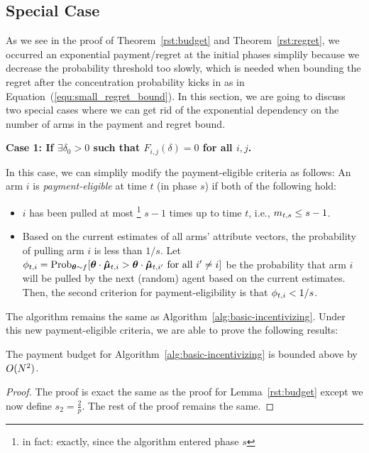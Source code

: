 \subsection{Special Case}

As we see in the proof of Theorem~\ref{rst:budget} and Theorem~\ref{rst:regret}, we occurred an exponential payment/regret at the initial phases simplily because we decrease the probability threshold too slowly, which is needed when bounding the regret after the concentration probability kicks in as in Equation~(\ref{equ:small_regret_bound}). In this section, we are going to discuss two special cases where we can get rid of the exponential dependency on the number of arms in the payment and regret bound. 

\textbf{Case 1: If $\exists \delta_0>0$ such that $F_{i,j}(\delta)=0$ for all $i,j$.}

In this case, we can simplily modify the payment-eligible criteria as follows: An arm $i$ is \emph{payment-eligible} at time $t$ (in phase $s$)
if both of the following hold:

\begin{itemize}
\item $i$ has been pulled at most%
\footnote{in fact: exactly, since the algorithm entered phase $s$}
$s-1$ times up to time $t$, i.e., $m_{t,s} \leq s-1$.
\item Based on the current estimates  of all arms'
attribute vectors, the probability of pulling arm $i$ is less than $1/s$. Let $\PullProb{t}{i} = \Prob[\AgV \sim \AgentDist]{\AgV \cdot \ArmEV{t}{i} > \AgV
  \cdot \ArmEV{t}{i'} \mbox{ for all } i' \neq i}$
be the probability that arm $i$ will be pulled
by the next (random) agent based on the current estimates. 
Then, the second criterion for payment-eligibility is that
$\phi_{t,i} < 1/s$.
\end{itemize}

The algorithm remains the same as Algorithm~\ref{alg:basic-incentivizing}. Under this new payment-eligible criteria, we are able to prove the following results:

\begin{theorem}
The payment budget for Algorithm~\ref{alg:basic-incentivizing} is bounded above by $O(N^2)$. 
\end{theorem}

\begin{proof}
The proof is exact the same as the proof for Lemma~\ref{rst:budget} except we now define $s_2 =\frac{2}{p}$. The rest of the proof remains the same.
\end{proof}



